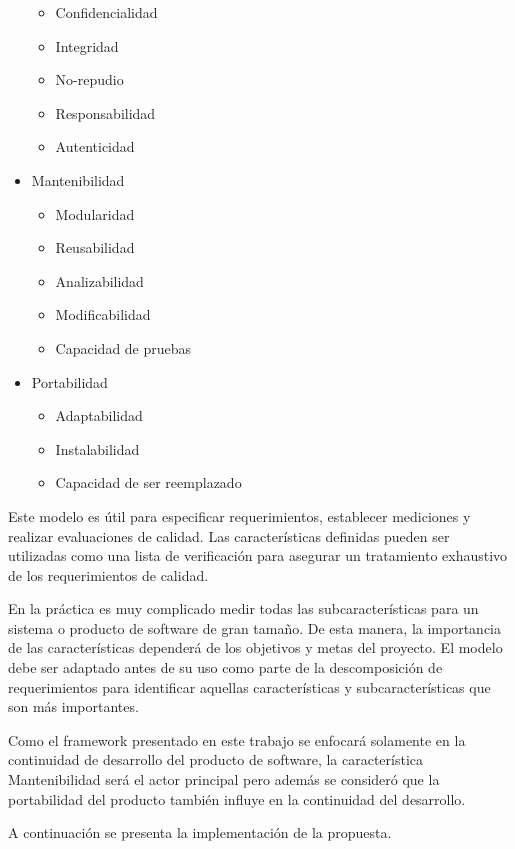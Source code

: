 \begin{itemize}
    \begin{itemize}
        \item Confidencialidad
        \item Integridad
        \item No-repudio
        \item Responsabilidad
        \item Autenticidad
    \end{itemize}
\item Mantenibilidad
    \begin{itemize}
        \item Modularidad
        \item Reusabilidad
        \item Analizabilidad
        \item Modificabilidad
        \item Capacidad de pruebas
    \end{itemize}
\item Portabilidad
    \begin{itemize}
        \item Adaptabilidad
        \item Instalabilidad
        \item Capacidad de ser reemplazado
    \end{itemize}
\end{itemize}

Este modelo es útil para especificar requerimientos, establecer mediciones y 
realizar evaluaciones de calidad. Las características definidas pueden ser utilizadas
como una lista de verificación para asegurar un tratamiento exhaustivo de
los requerimientos de calidad.

En la práctica es muy complicado medir todas las subcaracterísticas para un sistema
o producto de software de gran tamaño. De esta manera, la importancia de las 
características dependerá de los objetivos y metas del proyecto. El modelo
debe ser adaptado antes de su uso como parte de la descomposición de requerimientos
para identificar aquellas características y subcaracterísticas que son más
importantes.

Como el framework presentado en este trabajo se enfocará solamente en la
continuidad de desarrollo del producto
de software, la característica Mantenibilidad será el actor principal pero además
se consideró que la portabilidad del producto también influye en la continuidad del desarrollo.

A continuación se presenta la implementación de la propuesta.

